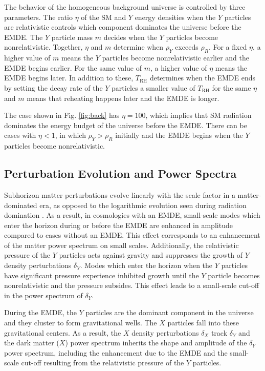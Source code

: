 \documentclass[a4paper,11pt]{article}
\newcommand{\rh}[1]{{#1}_{\mathrm{RH}}}
\begin{document}
The behavior of the homogeneous background universe is controlled by three parameters. The ratio $\eta$ of the SM and $Y$ energy densities when the $Y$ particles are relativistic controls which component dominates the universe before the EMDE. The $Y$ particle mass $m$ decides when the $Y$ particles become nonrelativistic. Together, $\eta$ and $m$ determine when $\rho_Y$ exceeds $\rho_R$. For a fixed $\eta$, a higher value of $m$ means the $Y$ particles become nonrelativistic earlier and the EMDE begins earlier. For the same value of $m$, a higher value of $\eta$ means the EMDE begins later. In addition to these, $\rh{T}$ determines when the EMDE ends by setting the decay rate of the $Y$ particles {\textemdash} a smaller value of $\rh{T}$ for the same $\eta$ and $m$ means that reheating happens later and the EMDE is longer. 

The case shown in Fig. \ref{fig:back} has $\eta=100$, which implies that SM radiation dominates the energy budget of the universe before the EMDE. There can be cases with $\eta<1$, in which $\rho_Y > \rho_R$ initially and the EMDE begins when the $Y$ particles become nonrelativistic. 

\subsection{Perturbation Evolution and Power Spectra}

Subhorizon matter perturbations evolve linearly with the scale factor in a matter-dominated era, as opposed to the logarithmic evolution seen during radiation domination \cite{ae15}. As a result, in cosmologies with an EMDE, small-scale modes which enter the horizon during or before the EMDE are enhanced in amplitude compared to cases without an EMDE. This effect corresponds to an enhancement of the matter power spectrum on small scales. Additionally, the relativistic pressure of the $Y$ particles acts against gravity and suppresses the growth of $Y$ density perturbations $\delta_Y$. Modes which enter the horizon when the $Y$ particles have significant pressure experience inhibited growth until the $Y$ particle becomes nonrelativistic and the pressure subsides. This effect leads to a small-scale cut-off in the power spectrum of $\delta_Y$. 

During the EMDE, the $Y$ particles are the dominant component in the universe and they cluster to form gravitational wells. The $X$ particles fall into these gravitational centers. As a result, the $X$ density perturbations $\delta_X$ track $\delta_Y$ and the dark matter ($X$) power spectrum inherits the shape and amplitude of the $\delta_Y$ power spectrum, including the enhancement due to the EMDE and the small-scale cut-off resulting from the relativistic pressure of the $Y$ particles. 
\end{document}
